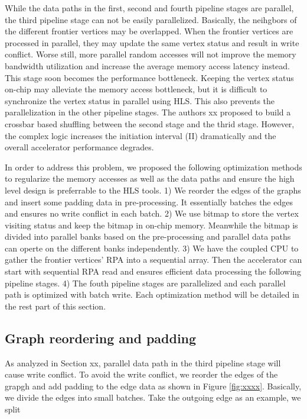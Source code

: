 While the data paths in the first, second and fourth pipeline stages are parallel,
the third pipeline stage can not be easily parallelized. Basically, the neihgbors of 
the different frontier vertices may be overlapped. When the frontier vertices are 
processed in parallel, they may update the same vertex status and result in write 
conflict. Worse still, more parallel random accesses will not improve the memory 
bandwidth utilization and increase the average memory access latency instead. 
This stage soon becomes the performance bottleneck. Keeping the vertex status on-chip 
may alleviate the memory access bottleneck, but it is difficult to synchronize the 
vertex status in parallel using HLS. This also prevents the parallelization in the 
other pipeline stages. The authors xx proposed to build a crossbar based shuffling 
between the second stage and the thrid stage. However, the complex logic increases the 
initiation interval (II) dramatically and the overall accelerator performance degrades.

In order to address this problem, we proposed the following optimization methods 
to regularize the memory accesses as well as the data paths and ensure the high level 
design is preferrable to the HLS tools. 1) We reorder the edges of the graphs and insert 
some padding data in pre-processing. It essentially batches the edges and ensures 
no write conflict in each batch. 2) We use bitmap to store the vertex visiting status and 
keep the bitmap in on-chip memory. Meanwhile the bitmap is divided into parallel banks 
based on the pre-processing and parallel data paths can operte on the different 
banks independently. 3) We have the coupled CPU to gather the frontier vertices' RPA into 
a sequential array. Then the accelerator can start with sequential RPA read and ensures 
efficient data processing the following pipeline stages. 4) The fouth pipeline stages 
are parallelized and each parallel path is optimized with batch write. Each optimization method
will be detailed in the rest part of this section.

\subsection{Graph reordering and padding}
As analyzed in Section xx, parallel data path in the third pipeline stage will cause 
write conflict. To avoid the write conflict, we reorder the edges of the grapgh and 
add padding to the edge data as shown in Figure \ref{fig:xxxx}. Basically, we divide the 
edges into small batches. Take the outgoing edge as an example, we split 

